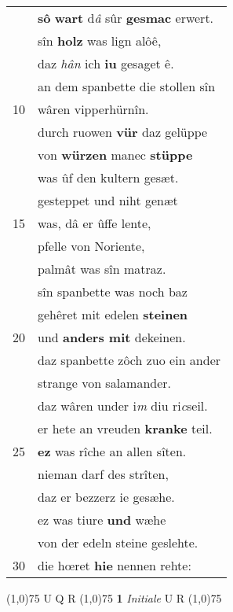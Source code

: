 \documentclass[8pt,a4paper,notitlepage]{article}
\begin{document}
\begin{table}[ht]
\begin{minipage}[t]{0.5\linewidth}
\begin{tabular}{rl}
 & \textbf{sô} \textbf{wart} d\textit{â} sûr \textbf{gesmac} erwert.\\ 
 & sîn \textbf{holz} was lign alôê,\\ 
 & daz \textit{hân} ich \textbf{iu} gesaget ê.\\ 
 & an dem spanbette die stollen sîn\\ 
10 & wâren vipperhürnîn.\\ 
 & durch ruowen \textbf{vür} daz gelüppe\\ 
 & von \textbf{würzen} manec \textbf{stüppe}\\ 
 & was ûf den kultern gesæt.\\ 
 & gesteppet und niht genæt\\ 
15 & was, dâ er ûffe lente,\\ 
 & pfelle von Noriente,\\ 
 & palmât was sîn matraz.\\ 
 & sîn spanbette was noch baz\\ 
 & gehêret mit edelen \textbf{steinen}\\ 
20 & und \textbf{anders mit} dekeinen.\\ 
 & daz spanbette zôch zuo ein ander\\ 
 & strange von salamander.\\ 
 & daz wâren under i\textit{m} diu ri\textit{c}seil.\\ 
 & er hete an vreuden \textbf{kranke} teil.\\ 
25 & \textbf{ez} was rîche an allen sîten.\\ 
 & nieman darf des strîten,\\ 
 & daz er bezzerz ie gesæhe.\\ 
 & ez was tiure \textbf{und} wæhe\\ 
 & von der edeln steine geslehte.\\ 
30 & die hœret \textbf{hie} nennen rehte:\\ 
\end{tabular}
\scriptsize
\line(1,0){75} \newline
U Q R \newline
\line(1,0){75} \newline
\textbf{1} \textit{Initiale} U R  \newline
\line(1,0){75} \newline

\end{minipage}
\end{table}
\end{document}
